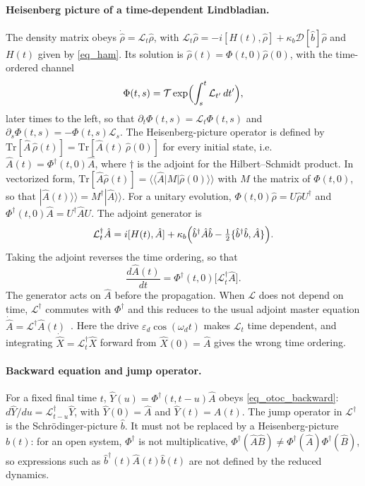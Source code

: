 \documentclass[aps,prx,reprint,floatfix,amsmath,amssymb,longbibliography]{revtex4-2}
\newcommand{\eps}{\varepsilon}
\newcommand{\da}{^\dagger}
\newcommand{\hb}{\hat{b}}
\begin{document}
\paragraph*{Heisenberg picture of a time-dependent Lindbladian.}
The density matrix obeys $\dot{\hat\rho}=\mathcal L_t\hat\rho$, with $\mathcal L_t\hat\rho=-i[H(t),\hat\rho]+\kappa_b\mathcal D[\hb]\hat\rho$ and $H(t)$ given by \cref{eq_ham}. Its solution is $\hat\rho(t)=\Phi(t,0)\hat\rho(0)$, with the time-ordered channel
\begin{equation}
    \Phi(t,s)=\mathcal T\exp\Bigl(\int_s^t\mathcal L_{t'}\,dt'\Bigr),
\end{equation}
later times to the left, so that $\partial_t\Phi(t,s)=\mathcal L_t\Phi(t,s)$ and $\partial_s\Phi(t,s)=-\Phi(t,s)\mathcal L_s$. The Heisenberg-picture operator is defined by $\mathrm{Tr}[\hat A\,\hat\rho(t)]=\mathrm{Tr}[\hat A(t)\,\hat\rho(0)]$ for every initial state, i.e.\ $\hat A(t)=\Phi^\dagger(t,0)\hat A$, where $\dagger$ is the adjoint for the Hilbert--Schmidt product. In vectorized form, $\mathrm{Tr}[\hat A\hat\rho(t)]=\langle\langle\hat A|M|\hat\rho(0)\rangle\rangle$ with $M$ the matrix of $\Phi(t,0)$, so that $|\hat A(t)\rangle\rangle=M^\dagger|\hat A\rangle\rangle$. For a unitary evolution, $\Phi(t,0)\hat\rho=U\hat\rho U^\dagger$ and $\Phi^\dagger(t,0)\hat A=U^\dagger\hat AU$. The adjoint generator is
\begin{equation}
    \mathcal L_t^\dagger\hat A=i[H(t),\hat A]+\kappa_b\Bigl(\hb\da\hat A\hb-\tfrac12\{\hb\da\hb,\hat A\}\Bigr).
\end{equation}
Taking the adjoint reverses the time ordering, so that
\begin{equation}
    \frac{d\hat A(t)}{dt}=\Phi^\dagger(t,0)\bigl[\mathcal L_t^\dagger\hat A\bigr].
\end{equation}
The generator acts on $\hat A$ before the propagation. When $\mathcal L$ does not depend on time, $\mathcal L^\dagger$ commutes with $\Phi^\dagger$ and this reduces to the usual adjoint master equation $\dot{\hat A}=\mathcal L^\dagger\hat A(t)$~\cite[p.~125]{Breuer2006Jan}. Here the drive $\eps_d\cos(\omega_dt)$ makes $\mathcal L_t$ time dependent, and integrating $\dot{\hat X}=\mathcal L_t^\dagger\hat X$ forward from $\hat X(0)=\hat A$ gives the wrong time ordering.

\paragraph*{Backward equation and jump operator.}
For a fixed final time $t$, $\hat Y(u)=\Phi^\dagger(t,t-u)\hat A$ obeys \cref{eq_otoc_backward}: $d\hat Y/du=\mathcal L^\dagger_{t-u}\hat Y$, with $\hat Y(0)=\hat A$ and $\hat Y(t)=\hat A(t)$. The jump operator in $\mathcal L^\dagger$ is the Schrödinger-picture $\hb$. It must not be replaced by a Heisenberg-picture $\hb(t)$: for an open system, $\Phi^\dagger$ is not multiplicative, $\Phi^\dagger(\hat A\hat B)\neq\Phi^\dagger(\hat A)\Phi^\dagger(\hat B)$, so expressions such as $\hb\da(t)\hat A(t)\hb(t)$ are not defined by the reduced dynamics.
\end{document}
